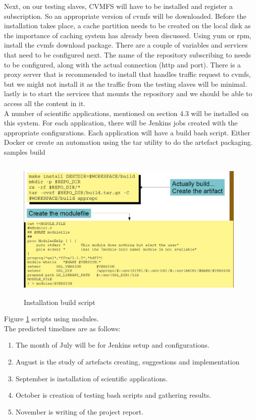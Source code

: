\documentclass [titlepage,11pt]{article}
\begin{document}
Next, on our testing slaves, CVMFS will have to be installed and register a subscription. So an appropriate version of cvmfs will be downloaded. Before the installation takes place, a cache partition needs to be created on the local disk as the importance of caching system has already been discussed. Using yum or rpm, install the cvmfs download package. There are a couple of variables and services that need to be configured next. The name of the repository subscribing to needs to be configured, along with the actual connection (http and port). There is a proxy server that is recommended to install that handles traffic request to cvmfs, but we might not install it as the traffic from the testing slaves will be minimal. lastly is to start the services that mounts the repository and we should be able to access all the content in it. \\

A number of scientific applications, mentioned on section 4.3 will be installed on this system. For each application, there will be Jenkins jobs created with the appropriate configurations. Each application will have a build bash script. Either Docker or create an automation using the tar utility to do the artefact packaging.  samples build  
\begin{figure}[!ht]
\centering
\includegraphics[width=14cm,height=7cm]{build.jpg}
\caption{Installation build script}
\label{fig:build}
\end{figure} 
Figure \ref{fig:build} scripts using modules. \\


The predicted timelines are as follows: 
\begin{enumerate}
\item The month of July will be for Jenkins setup and configurations.
\item August is the study of artefacts creating, suggestions and implementation 
\item September is installation of scientific applications.
\item October is creation of testing bash scripts and gathering results.
\item November is writing of the project report.
\end{enumerate}
\end{document}
